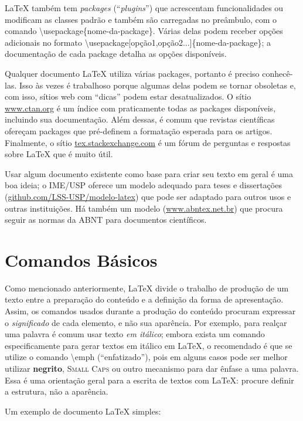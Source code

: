 \LaTeX{} também tem \textit{packages} (``\textit{plugins}'') que acrescentam
funcionalidades ou modificam as classes padrão e também são carregadas no
preâmbulo, com o comando \textsf{\textbackslash{}usepackage\{nome-da-package\}}.
Várias delas podem receber opções adicionais no formato
\textsf{\textbackslash{}usepackage[opção1,opção2...]\{nome-da-package\}};
a documentação de cada package detalha as opções disponíveis.

Qualquer documento \LaTeX{} utiliza várias packages, portanto é preciso
conhecê-las. Isso às vezes é trabalhoso porque algumas delas podem se
tornar obsoletas e, com isso, sítios web com ``dicas'' podem estar
desatualizados. O sítio \url{www.ctan.org} é um índice com praticamente
todas as packages disponíveis, incluindo sua documentação. Além dessas,
é comum que revistas científicas ofereçam packages que pré-definem a
formatação esperada para os artigos. Finalmente, o sítio
\url{tex.stackexchange.com} é um fórum de perguntas e respostas sobre
\LaTeX{} que é muito útil.

Usar algum documento existente como base para criar seu texto em geral é
uma boa ideia; o IME/USP oferece um modelo adequado para teses e
dissertações (\url{github.com/LSS-USP/modelo-latex}) que pode ser
adaptado para outros usos e outras instituições. Há também um modelo
(\url{www.abntex.net.br}) que procura seguir as normas da ABNT para
documentos científicos.

\section{Comandos Básicos}

Como mencionado anteriormente, \LaTeX{} divide o trabalho de produção
de um texto entre a preparação do conteúdo e a definição da forma de
apresentação. Assim, os comandos usados durante a produção do conteúdo
procuram expressar o \emph{significado} de cada elemento, e não sua
aparência. Por exemplo, para realçar uma palavra é comum usar texto
\textit{em itálico}; embora exista um comando especificamente para gerar
textos em itálico em \LaTeX{}, o recomendado é que se utilize o comando
\textsf{\textbackslash{}emph} (``enfatizado''), pois em alguns casos
pode ser melhor utilizar \textbf{negrito}, \textsc{Small Caps} ou
outro mecanismo para dar ênfase a uma palavra. Essa é uma orientação
geral para a escrita de textos com \LaTeX{}: procure definir a estrutura,
não a aparência.

Um exemplo de documento \LaTeX{} simples:

